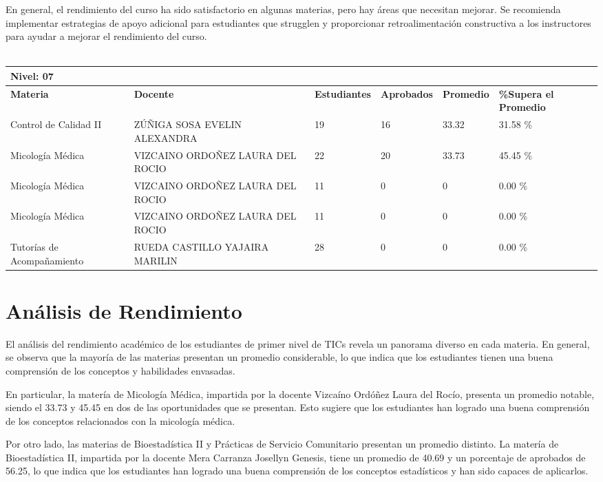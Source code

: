 En general, el rendimiento del curso ha sido satisfactorio en algunas materias, pero hay áreas que necesitan mejorar. Se recomienda implementar estrategias de apoyo adicional para estudiantes que strugglen y proporcionar retroalimentación constructiva a los instructores para ayudar a mejorar el rendimiento del curso.\\
\vspace{1cm}\\\small
\begin{tabularx}{\textwidth}{|p{2.5cm}|p{2.5cm}|X|X|X|X|}
\hline
\multicolumn{6}{|X|}{\textbf{Nivel: 07 }}\\\hline\textbf{Materia} & \textbf{Docente} & \textbf{Estudiantes} & \textbf{Aprobados} & \textbf{Promedio} & \textbf{\%Supera el Promedio} \\ \hline
Control de Calidad II & ZÚÑIGA SOSA EVELIN ALEXANDRA & 19 & 16 & 33.32 & 31.58 \%\\ \hline
Micología Médica & VIZCAINO ORDOÑEZ LAURA DEL ROCIO  & 22 & 20 & 33.73 & 45.45 \%\\ \hline
Micología Médica & VIZCAINO ORDOÑEZ LAURA DEL ROCIO  & 11 & 0 & 0 & 0.00 \%\\ \hline
Micología Médica & VIZCAINO ORDOÑEZ LAURA DEL ROCIO  & 11 & 0 & 0 & 0.00 \%\\ \hline
Tutorías de Acompañamiento & RUEDA CASTILLO YAJAIRA MARILIN & 28 & 0 & 0 & 0.00 \%\\ \hline
\end{tabularx}

\vspace{1cm}
\section{Análisis de Rendimiento}
El análisis del rendimiento académico de los estudiantes de primer nivel de TICs revela un panorama diverso en cada materia. En general, se observa que la mayoría de las materias presentan un promedio considerable, lo que indica que los estudiantes tienen una buena comprensión de los conceptos y habilidades envasadas.

En particular, la matería de Micología Médica, impartida por la docente Vizcaíno Ordóñez Laura del Rocío, presenta un promedio notable, siendo el 33.73 y 45.45 en dos de las oportunidades que se presentan. Esto sugiere que los estudiantes han logrado una buena comprensión de los conceptos relacionados con la micología médica.

Por otro lado, las materias de Bioestadística II y Prácticas de Servicio Comunitario presentan un promedio distinto. La matería de Bioestadística II, impartida por la docente Mera Carranza Josellyn Genesis, tiene un promedio de 40.69 y un porcentaje de aprobados de 56.25, lo que indica que los estudiantes han logrado una buena comprensión de los conceptos estadísticos y han sido capaces de aplicarlos.

